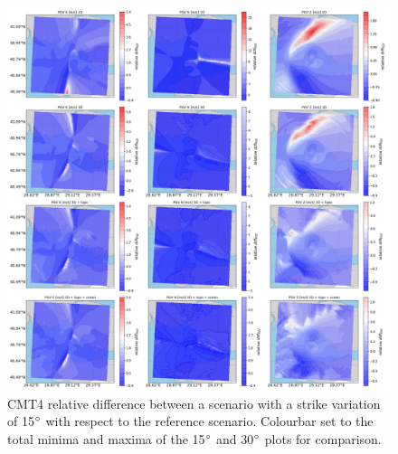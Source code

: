\documentclass[../Text/00main.tex]{subfiles}
\begin{document}
\begin{figure}[!h]
    \centering
    \includegraphics[width=1.2\linewidth]{images_results/rake_variation_epsilon12_sc4.png}
    \caption{CMT4 relative difference between a scenario with a strike variation of 15$\degree$ with respect to the reference scenario. Colourbar set to the total minima and maxima of the 15$\degree$ and 30$\degree$ plots for comparison.}
    \label{fig:ref_eps12-2}
\end{figure}

\FloatBarrier
\end{document}
